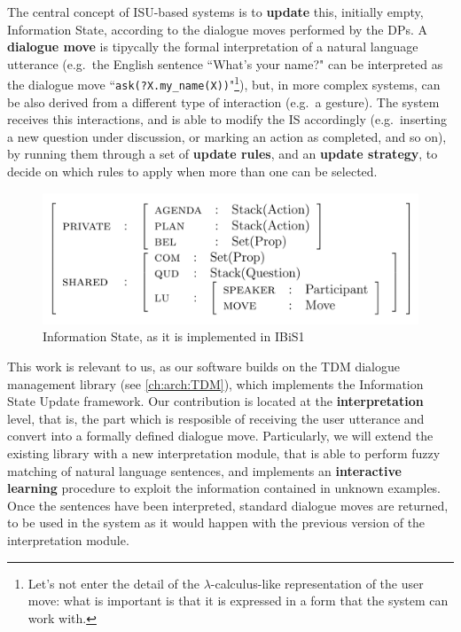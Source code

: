 The central concept of ISU-based systems is to \textbf{update} this, initially empty, Information State, according to the dialogue moves performed by the DPs. A \textbf{dialogue move} is tipycally the formal interpretation of a natural language utterance (e.g.\ the English sentence ``What's your name?" can be interpreted as the dialogue move ``\texttt{ask(?X.my\_name(X))}"\footnote{Let's not enter the detail of the $\lambda$-calculus-like representation of the user move: what is important is that it is expressed in a form that the system can work with.}), but, in more complex systems, can be also derived from a different type of interaction (e.g.\ a gesture). The system receives this interactions, and is able to modify the IS accordingly (e.g.\ inserting a new question under discussion, or marking an action as completed, and so on), by running them through a set of \textbf{update rules}, and an \textbf{update strategy}, to decide on which rules to apply when more than one can be selected.

\begin{figure}
	\centering
	\includegraphics{Pictures/ibis1_is.png}
	\caption{Information State, as it is implemented in IBiS1}
	\label{ch:rw:ds:isu:ibisis}
\end{figure}

This work is relevant to us, as our software builds on the TDM dialogue management library (see \ref{ch:arch:TDM}), which implements the Information State Update framework. Our contribution is located at the \textbf{interpretation} level, that is, the part which is resposible of receiving the user utterance and convert into a formally defined dialogue move. Particularly, we will extend the existing library with a new interpretation module, that is able to perform fuzzy matching of natural language sentences, and implements an \textbf{interactive learning} procedure to exploit the information contained in unknown examples. Once the sentences have been interpreted, standard dialogue moves are returned, to be used in the system as it would happen with the previous version of the interpretation module.

